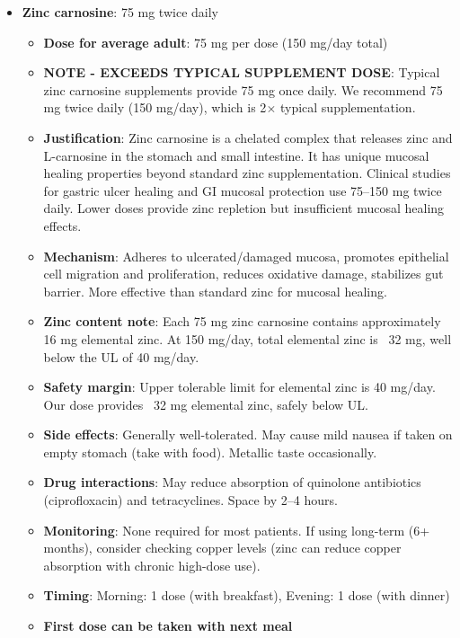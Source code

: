 \begin{enumerate}
\begin{itemize}
        \item \textbf{Zinc carnosine}: 75 mg twice daily
        \begin{itemize}
            \item \textbf{Dose for average adult}: 75 mg per dose (150 mg/day total)
            \item \textbf{NOTE - EXCEEDS TYPICAL SUPPLEMENT DOSE}: Typical zinc carnosine supplements provide 75 mg once daily. We recommend 75 mg twice daily (150 mg/day), which is 2$\times$ typical supplementation.
            \item \textbf{Justification}: Zinc carnosine is a chelated complex that releases zinc and L-carnosine in the stomach and small intestine. It has unique mucosal healing properties beyond standard zinc supplementation. Clinical studies for gastric ulcer healing and GI mucosal protection use 75--150 mg twice daily. Lower doses provide zinc repletion but insufficient mucosal healing effects.
            \item \textbf{Mechanism}: Adheres to ulcerated/damaged mucosa, promotes epithelial cell migration and proliferation, reduces oxidative damage, stabilizes gut barrier. More effective than standard zinc for mucosal healing.
            \item \textbf{Zinc content note}: Each 75 mg zinc carnosine contains approximately 16 mg elemental zinc. At 150 mg/day, total elemental zinc is ~32 mg, well below the UL of 40 mg/day.
            \item \textbf{Safety margin}: Upper tolerable limit for elemental zinc is 40 mg/day. Our dose provides ~32 mg elemental zinc, safely below UL.
            \item \textbf{Side effects}: Generally well-tolerated. May cause mild nausea if taken on empty stomach (take with food). Metallic taste occasionally.
            \item \textbf{Drug interactions}: May reduce absorption of quinolone antibiotics (ciprofloxacin) and tetracyclines. Space by 2--4 hours.
            \item \textbf{Monitoring}: None required for most patients. If using long-term (6+ months), consider checking copper levels (zinc can reduce copper absorption with chronic high-dose use).
            \item \textbf{Timing}: Morning: 1 dose (with breakfast), Evening: 1 dose (with dinner)
            \item \textbf{First dose can be taken with next meal}
        \end{itemize}


\end{itemize}
\end{enumerate}
